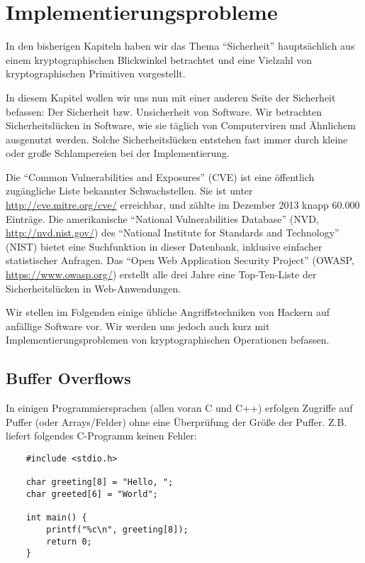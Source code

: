 
\chapter{Implementierungsprobleme}

In den bisherigen Kapiteln haben wir das Thema "`Sicherheit"' hauptsächlich aus einem kryptographischen Blickwinkel betrachtet und eine Vielzahl von kryptographischen Primitiven vorgestellt.

In diesem Kapitel wollen wir uns nun mit einer anderen Seite der Sicherheit befassen: Der Sicherheit bzw. Unsicherheit von Software. Wir betrachten Sicherheitslücken in Software, wie sie täglich von Computerviren und Ähnlichem ausgenutzt werden. Solche Sicherheitslücken entstehen fast immer durch kleine oder große Schlampereien bei der Implementierung.

Die "`Common Vulnerabilities and Exposures"' (CVE) ist eine öffentlich zugängliche Liste bekannter Schwachstellen.
Sie ist unter \url{http://cve.mitre.org/cve/} erreichbar, und zählte im Dezember 2013 knapp 60.000 Einträge.
Die amerikanische "`National Vulnerabilities Database"' (NVD, \url{http://nvd.nist.gov/}) des "`National Institute for Standards and Technology"' (NIST) bietet eine Suchfunktion in dieser Datenbank, inklusive einfacher statistischer Anfragen.
Das "`Open Web Application Security Project"' (OWASP, \url{https://www.owasp.org/}) erstellt alle drei Jahre eine Top-Ten-Liste der Sicherheitslücken in Web-Anwendungen.

Wir stellen im Folgenden einige übliche Angriffstechniken von Hackern auf anfällige Software vor. Wir werden uns jedoch auch kurz mit Implementierungsproblemen von kryptographischen Operationen befassen.

\section{Buffer Overflows}
In einigen Programmiersprachen (allen voran C und C++) erfolgen Zugriffe auf Puffer (oder Arrays/Felder) ohne eine Überprüfung der Größe der Puffer. Z.B. liefert folgendes C-Programm keinen Fehler:


\begin{lstlisting}
	#include <stdio.h>
	
	char greeting[8] = "Hello, ";
	char greeted[6] = "World";
	
	int main() {
		printf("%c\n", greeting[8]);
		return 0;
	}
\end{lstlisting}


